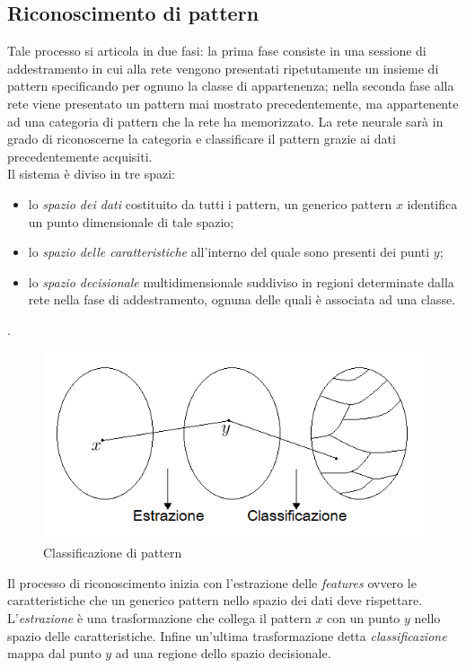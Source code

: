 \documentclass[12pt,a4paper,oneside]{book}
\begin{document}
		\subsection{Riconoscimento di pattern}
		
		Tale processo si articola in due fasi: la prima fase consiste in una sessione di addestramento in cui  alla rete vengono presentati ripetutamente un insieme di pattern specificando per ognuno la classe di appartenenza; nella seconda fase alla rete viene presentato un pattern mai mostrato precedentemente, ma appartenente ad una categoria di pattern che la rete ha memorizzato. La rete neurale sarà in grado di riconoscerne la categoria e classificare il pattern grazie ai dati precedentemente acquisiti.\\
		Il sistema è diviso in tre spazi:\\
		
		\begin{itemize}
		\item lo \emph{spazio dei dati} costituito da tutti i pattern, un generico pattern $x$ identifica un punto dimensionale di tale spazio;
		\item lo \emph{spazio delle caratteristiche} all'interno del quale sono presenti dei punti $y$;
		\item lo \emph{spazio decisionale} multidimensionale suddiviso in regioni determinate dalla rete nella fase di addestramento, ognuna delle quali è associata ad una classe.
		\end{itemize}.
		
		\begin{figure}[h]
			\centering
			\includegraphics[width=0.8\linewidth]{IMMAGINI/classificazione}
			\caption{ Classificazione di pattern }
			\label{fig:classificazione}
		\end{figure}
		
		Il processo di riconoscimento inizia con l'estrazione delle \emph{features} ovvero le caratteristiche che un generico pattern nello spazio dei dati deve rispettare. L'\emph{estrazione} è una trasformazione che collega il pattern $x$ con un punto $y$ nello spazio delle caratteristiche. Infine un'ultima trasformazione detta \emph{classificazione} mappa dal punto $y$ ad una regione dello spazio decisionale.\\
		
\end{document}
